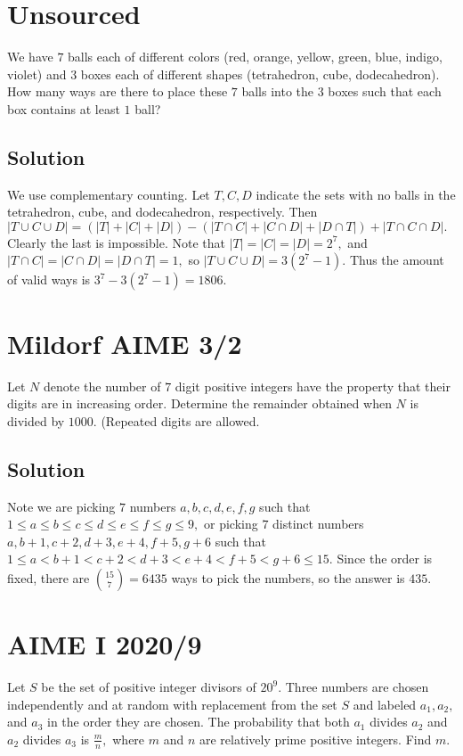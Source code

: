 \documentclass[blue,onecol]{shooting}
\begin{document}
\section{Unsourced}
We have $7$ balls each of different colors (red, orange, yellow, green, blue, indigo, violet) and $3$ boxes each of different shapes (tetrahedron, cube, dodecahedron). How many ways are there to place these $7$ balls into the $3$ boxes such that each box contains at least $1$ ball?

\subsection{Solution}
We use complementary counting. Let $T,C,D$ indicate the sets with no balls in the tetrahedron, cube, and dodecahedron, respectively. Then $|T\cup C\cup D|=(|T|+|C|+|D|)-(|T\cap C|+|C\cap D|+|D\cap T|)+|T\cap C\cap D|.$ Clearly the last is impossible. Note that $|T|=|C|=|D|=2^7,$ and $|T\cap C|=|C\cap D|=|D\cap T|=1,$ so $|T\cup C\cup D|=3(2^7-1).$ Thus the amount of valid ways is $3^7-3(2^7-1)=1806.$

\section{Mildorf AIME 3/2}
Let $N$ denote the number of $7$ digit positive integers have the property that their digits are in increasing order. Determine the remainder obtained when $N$ is divided by $1000$. (Repeated digits are allowed.

\subsection{Solution}
Note we are picking $7$ numbers $a,b,c,d,e,f,g$ such that $1\leq a\leq b\leq c\leq d\leq e\leq f\leq g\leq 9,$ or picking $7$ distinct numbers $a,b+1,c+2,d+3,e+4,f+5,g+6$ such that $1\leq a< b+1< c+2< d+3< e+4< f+5< g+6\leq 15.$ Since the order is fixed, there are $\binom{15}{7}=6435$ ways to pick the numbers, so the answer is $435.$

\section{AIME I 2020/9}
Let $S$ be the set of positive integer divisors of $20^9.$ Three numbers are chosen independently and at random with replacement from the set $S$ and labeled $a_1,a_2,$ and $a_3$ in the order they are chosen. The probability that both $a_1$ divides $a_2$ and $a_2$ divides $a_3$ is $\tfrac{m}{n},$ where $m$ and $n$ are relatively prime positive integers. Find $m.$
\end{document}
